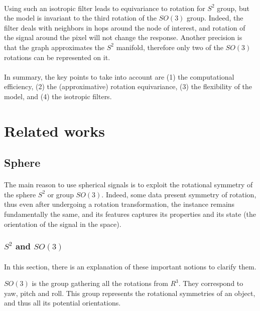 \documentclass[11pt]{report}
\begin{document}
\paragraph*{}
Using such an isotropic filter leads to equivariance to rotation for $S^2$ group, but the model is invariant to the third rotation of the $SO(3)$ group. Indeed, the filter deals with neighbors in hops around the node of interest, and rotation of the signal around the pixel will not change the response.
Another precision is that the graph approximates the $S^2$ manifold, therefore only two of the $SO(3)$ rotations can be represented on it.



\paragraph*{}
In summary, the key points to take into account are (1) the computational efficiency, (2) the (approximative) rotation equivariance, (3) the flexibility of the model, and (4) the isotropic filters.

\section{Related works}
\subsection{Sphere}
\paragraph*{}
The main reason to use spherical signals is to exploit the rotational symmetry of the sphere $S^2$ or group $SO(3)$. Indeed, some data present symmetry of rotation, thus even after undergoing a rotation transformation, the instance remains fundamentally the same, and its features captures its properties and its state (the orientation of the signal in the space).

\subsubsection{$S^2$ and $SO(3)$}
\paragraph*{}
In this section, there is an explanation of these important notions to clarify them.

$SO(3)$ is the group gathering all the rotations from $R^3$. They correspond to yaw, pitch and roll. This group represents the rotational symmetries of an object, and thus all its potential orientations.
        
\end{document}
